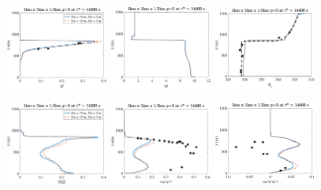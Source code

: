 \documentclass{report}
\begin{document}
\begin{figure}
    \centering
	\includegraphics[width=0.3\textwidth]{./figures/benchmarks/dycoms/dycoms_smago_dz_3m_vs_2m_qt9_dycoms_ql_15mX15mX2m_t14200s-legend}
	\includegraphics[width=0.3\textwidth]{./figures/benchmarks/dycoms/dycoms_smago_dz_3m_vs_2m_qt9_dycoms_qt_15mX15mX2m_t14400s}
	\includegraphics[width=0.3\textwidth]{./figures/benchmarks/dycoms/dycoms_smago_dz_3m_vs_2m_qt9_dycoms_thl_15mX15mX2m_t14400s}
	
	\includegraphics[width=0.3\textwidth]{./figures/benchmarks/dycoms/dycoms_smago_dz_3m_vs_2m_qt9_dycoms_tke_15mX15mX2m_t14200s-legend}
	\includegraphics[width=0.3\textwidth]{./figures/benchmarks/dycoms/dycoms_smago_dz_3m_vs_2m_qt9_dycoms_ww_15mX15mX2m_t14400s}
	\includegraphics[width=0.3\textwidth]{./figures/benchmarks/dycoms/dycoms_smago_dz_3m_vs_2m_qt9_dycoms_www_15mX15mX2m_t14400s}
	

\end{figure}
\end{document}
